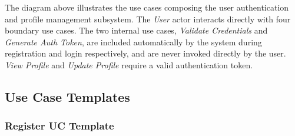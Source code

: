 The diagram above illustrates the use cases composing the user authentication and profile management subsystem. The \textit{User} actor interacts directly with four boundary use cases. The two internal use cases, \textit{Validate Credentials} and \textit{Generate Auth Token}, are included automatically by the system during registration and login respectively, and are never invoked directly by the user. \textit{View Profile} and \textit{Update Profile} require a valid authentication token.

\subsection{Use Case Templates}

\subsubsection{Register UC Template}
